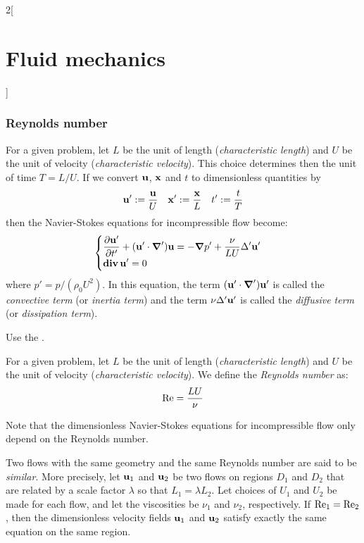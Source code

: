 \documentclass[../../../main_physics.tex]{subfiles}
\begin{document}
\begin{multicols}{2}[\section{Fluid mechanics}]
  \subsubsection{Reynolds number}
  \begin{proposition}
    For a given problem, let $L$ be the unit of length (\emph{characteristic length}) and $U$ be the unit of velocity (\emph{characteristic velocity}). This choice determines then the unit of time $T=L/U$. If we convert $\boldsymbol{\mathrm{u}}$, $\boldsymbol{\mathrm{x}}$ and $t$ to dimensionless quantities by
    $$
      \boldsymbol{\mathrm{u}}':= \frac{\boldsymbol{\mathrm{u}}}{U}\quad \boldsymbol{\mathrm{x}}':=\frac{\boldsymbol{\mathrm{x}}}{L}\quad t':=\frac{t}{T}
    $$
    then the Navier-Stokes equations for incompressible flow become:
    $$
      \begin{cases}
        \displaystyle\pdv{\boldsymbol{\mathrm{u}}'}{t'}+(\boldsymbol{\mathrm{u}}'\cdot\grad')\boldsymbol{\mathrm{u}}=-\grad p' + \frac{\nu}{LU}\Delta'\boldsymbol{\mathrm{u}}' \\
        \displaystyle\operatorname{\boldsymbol{\mathrm{div}}}\boldsymbol{\mathrm{u}}'=0
      \end{cases}
    $$
    where $p'=p/(\rho_0 U^2)$. In this equation, the term $(\boldsymbol{\mathrm{u}}'\cdot \grad')\boldsymbol{\mathrm{u}}'$ is called the \emph{convective term} (or \emph{inertia term}) and the term $\nu\Delta'\boldsymbol{\mathrm{u}}'$ is called the \emph{diffusive term} (or \emph{dissipation term}).
  \end{proposition}
  \begin{sproof}
    Use the .
  \end{sproof}
  \begin{definition}
    For a given problem, let $L$ be the unit of length (\emph{characteristic length}) and $U$ be the unit of velocity (\emph{characteristic velocity}). We define the \emph{Reynolds number} as:
    $$
      \mathrm{Re}=\frac{LU}{\nu}
    $$
  \end{definition}
  \begin{remark}
    Note that the dimensionless Navier-Stokes equations for incompressible flow only depend on the Reynolds number.
  \end{remark}
  \begin{definition}
    Two flows with the same geometry and the same Reynolds number are said to be \emph{similar}. More precisely, let $\boldsymbol{\mathrm{u}}_1$ and $\boldsymbol{\mathrm{u}}_2$ be two flows on regions $D_1$
    and $D_2$ that are related by a scale factor $\lambda$ so that $L_1 = \lambda L_2$. Let choices
    of $U_1$ and $U_2$ be made for each flow, and let the viscosities be $\nu_1$ and $\nu_2$, respectively. If $\mathrm{Re}_1=\mathrm{Re}_2$, then the dimensionless velocity fields $\boldsymbol{\mathrm{u}}_1$ and $\boldsymbol{\mathrm{u}}_2$ satisfy exactly the same equation on the same region.

\end{definition}
\end{multicols}
\end{document}
